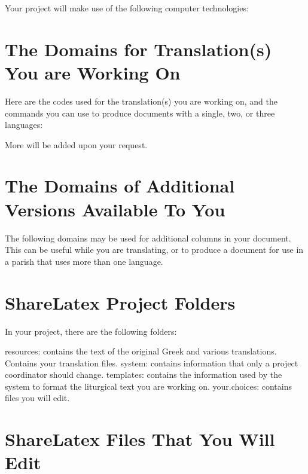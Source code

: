 \documentclass[]{memoir}
\begin{document}
Your project will make use of the following computer technologies:


\section{The Domains for Translation(s) You are Working On}

Here are the codes used for the translation(s) you are working on, and the commands you can use to produce documents with a single, two, or three languages:  


More will be added upon your request.

\section{The Domains of Additional Versions Available To You}

The following domains may be used for additional columns in your document.  This can be useful while you are translating, or to produce a document for use in a parish that uses more than one language.


\section{ShareLatex Project Folders}

In your project, there are the following folders:

\pex

\a resources: contains the text of the original Greek and various translations.  Contains your translation files.
\a system: contains information that only a project coordinator should change.
\a templates: contains the information used by the system to format the liturgical text you are working on.
\a your.choices: contains files you will edit.
\xe

\section{ShareLatex Files That You Will Edit}
\end{document}
